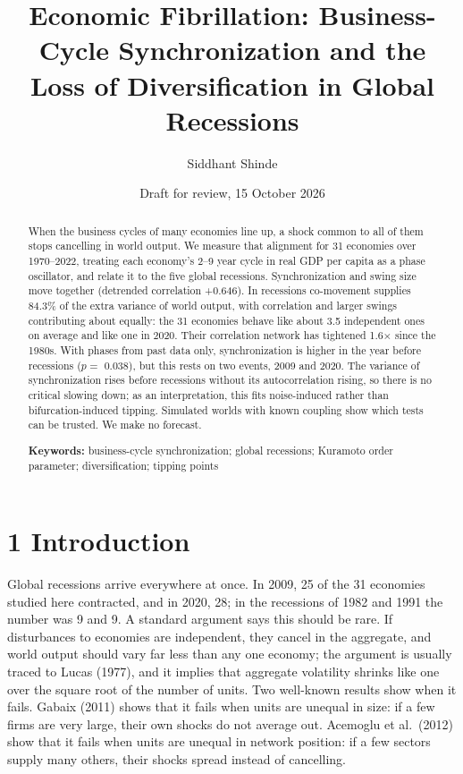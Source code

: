\documentclass[11pt,a4paper]{article}
\title{\bfseries Economic Fibrillation: Business-Cycle Synchronization and the Loss of Diversification in Global Recessions}
\author{Siddhant Shinde}
\date{Draft for review, 15 October 2026}
\begin{document}
\maketitle

\begin{abstract}
When the business cycles of many economies line up, a shock common to all of them stops cancelling in world output. We measure that alignment for 31 economies over 1970–2022, treating each economy's 2–9 year cycle in real GDP per capita as a phase oscillator, and relate it to the five global recessions. Synchronization and swing size move together (detrended correlation +0.646). In recessions co-movement supplies 84.3\% of the extra variance of world output, with correlation and larger swings contributing about equally: the 31 economies behave like about 3.5 independent ones on average and like one in 2020. Their correlation network has tightened 1.6× since the 1980s. With phases from past data only, synchronization is higher in the year before recessions (\(p =\) 0.038), but this rests on two events, 2009 and 2020. The variance of synchronization rises before recessions without its autocorrelation rising, so there is no critical slowing down; as an interpretation, this fits noise-induced rather than bifurcation-induced tipping. Simulated worlds with known coupling show which tests can be trusted. We make no forecast.

\medskip
\noindent\textbf{Keywords:} business-cycle synchronization; global recessions; Kuramoto order parameter; diversification; tipping points
\end{abstract}

\section{1 Introduction}\label{introduction}

Global recessions arrive everywhere at once. In 2009, 25 of the 31 economies studied here contracted, and in 2020, 28; in the recessions of 1982 and 1991 the number was 9 and 9. A standard argument says this should be rare. If disturbances to economies are independent, they cancel in the aggregate, and world output should vary far less than any one economy; the argument is usually traced to Lucas (1977), and it implies that aggregate volatility shrinks like one over the square root of the number of units. Two well-known results show when it fails. Gabaix (2011) shows that it fails when units are unequal in size: if a few firms are very large, their own shocks do not average out. Acemoglu et al.~(2012) show that it fails when units are unequal in network position: if a few sectors supply many others, their shocks spread instead of cancelling.
\end{document}
